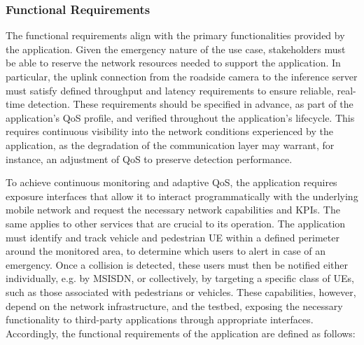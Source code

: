 \subsubsection{Functional Requirements}
\label{chap:proposal:use-case-validation:requirements:functional}

The functional requirements align with the primary functionalities provided by the application. Given the emergency nature of the use case, stakeholders must be able to reserve the network resources needed to support the application. In particular, the uplink connection from the roadside camera to the inference server must satisfy defined throughput and latency requirements to ensure reliable, real-time detection. These requirements should be specified in advance, as part of the application's \acs{QoS} profile, and verified throughout the application's lifecycle. This requires continuous visibility into the network conditions experienced by the application, as the degradation of the communication layer may warrant, for instance, an adjustment of \acs{QoS} to preserve detection performance.

To achieve continuous monitoring and adaptive \acs{QoS}, the application requires exposure interfaces that allow it to interact programmatically with the underlying mobile network and request the necessary network capabilities and \acsp{KPI}. The same applies to other services that are crucial to its operation. The application must identify and track vehicle and pedestrian \acs{UE} within a defined perimeter around the monitored area, to determine which users to alert in case of an emergency. Once a collision is detected, these users must then be notified either individually, e.g. by \acs{MSISDN}, or collectively, by targeting a specific class of \acsp{UE}, such as those associated with pedestrians or vehicles. These capabilities, however, depend on the network infrastructure, and the testbed, exposing the necessary functionality to third-party applications through appropriate interfaces. Accordingly, the functional requirements of the application are defined as follows:

